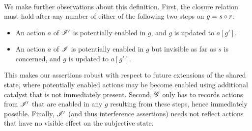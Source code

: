 \begin{definition}
\[\begin{array}{L}
\end{array}
\]
\end{definition}

We make further observations about this definition. First, the closure
relation must hold after any number of either of the following two
steps on $g = s\circ r$:
\begin{itemize}
\item
  An action $a$ of $\mathscr{I}'$ is potentially enabled in $g$, and $g$ is
  updated to $a[g']$.
\item
  An action $a$ of $\mathscr{I}$ is potentially enabled in $g$ but invisible
  as far as $s$ is concerned, and $g$ is updated to $a[g']$.
\end{itemize}
This makes our assertions robust with respect to future extensions of
the shared state, where potentially enabled actions may be become
enabled using additional catalyst that is not immediately
present. Second, $\mathscr{G}$ only has to records actions from $\mathscr{I}'$
that are enabled in any $g$ resulting from these steps, hence
immediately possible. Finally, $\mathscr{I}'$ (and thus interference
assertions) needs not reflect actions that have no visible effect on
the subjective state.



